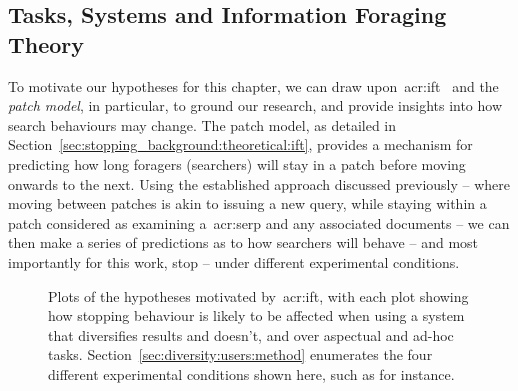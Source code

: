 \subsection{Tasks, Systems and Information Foraging Theory}\label{sec:diversity:background:tasks}
To motivate our hypotheses for this chapter, we can draw upon~\gls{acr:ift}~\citep{pirolli1999ift} and the \emph{patch model}, in particular, to ground our research, and provide insights into how search behaviours may change. The patch model, as detailed in Section~\ref{sec:stopping_background:theoretical:ift}, provides a mechanism for predicting how long foragers (searchers) will stay in a patch before moving onwards to the next. Using the established approach discussed previously -- where moving between patches is akin to issuing a new query, while staying within a patch considered as examining a~\gls{acr:serp} and any associated documents -- we can then make a series of predictions as to how searchers will behave -- and most importantly for this work, stop -- under different experimental conditions.

\begin{figure}[t!]
    \centering
    \caption[\gls{acr:ift} and diversification: hypothesis plots]{Plots of the hypotheses motivated by~\gls{acr:ift}, with each plot showing how stopping behaviour is likely to be affected when using a system that  diversifies results and  doesn't, and over  aspectual and  ad-hoc tasks. Section~\ref{sec:diversity:users:method} enumerates the four different experimental conditions shown here, such as  for instance.}
    \label{fig:ift_theory}
\end{figure}

